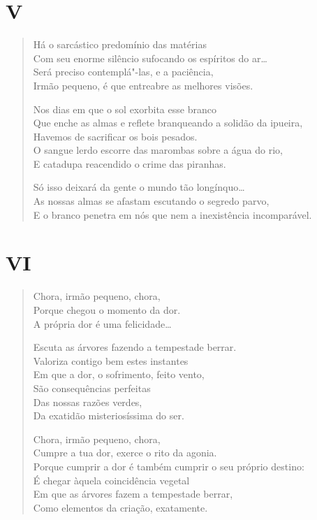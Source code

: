 \medskip
\section*{V}

\begin{verse}
Há o sarcástico predomínio das matérias\\
Com seu enorme silêncio sufocando os espíritos do ar\ldots{}\\
Será preciso contemplá"-las, e a paciência,\\
Irmão pequeno, é que entreabre as melhores visões.

Nos dias em que o sol exorbita esse branco\\
Que enche as almas e reflete branqueando a solidão da ipueira,\\
Havemos de sacrificar os bois pesados.\\
O sangue lerdo escorre das marombas sobre a água do rio,\\
E catadupa reacendido o crime das piranhas.

Só isso deixará da gente o mundo tão longínquo\ldots{}\\
As nossas almas se afastam escutando o segredo parvo,\\
E o branco penetra em nós que nem a inexistência incomparável.
\end{verse}

\medskip
\section*{VI}

\begin{verse}
Chora, irmão pequeno, chora,\\
Porque chegou o momento da dor.\\
A própria dor é uma felicidade\ldots{}

Escuta as árvores fazendo a tempestade berrar.\\
Valoriza contigo bem estes instantes\\
Em que a dor, o sofrimento, feito vento,\\
São consequências perfeitas\\
Das nossas razões verdes,\\
Da exatidão misteriosíssima do ser.

Chora, irmão pequeno, chora,\\
Cumpre a tua dor, exerce o rito da agonia.\\
Porque cumprir a dor é também cumprir o seu próprio destino:\\
É chegar àquela coincidência vegetal\\
Em que as árvores fazem a tempestade berrar,\\
Como elementos da criação, exatamente.
\end{verse}

